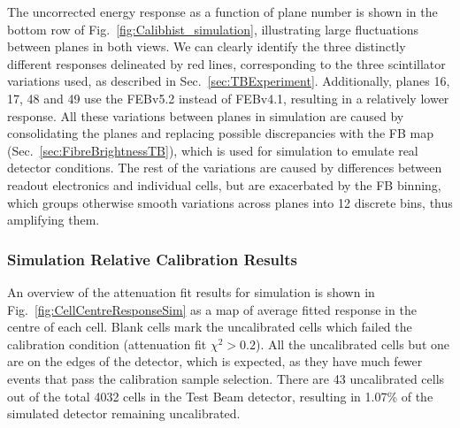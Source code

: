 The uncorrected energy response as a function of plane number is shown in the bottom row of Fig.~\ref{fig:Calibhist_simulation}, illustrating large fluctuations between planes in both views. We can clearly identify the three distinctly different responses delineated by red lines, corresponding to the three scintillator variations used, as described in Sec.~\ref{sec:TBExperiment}. Additionally, planes 16, 17, 48 and 49 use the \gls{FEB}v5.2 instead of \gls{FEB}v4.1, resulting in a relatively lower response. All these variations between planes in simulation are caused by consolidating the planes and replacing possible discrepancies with the \gls{FB} map (Sec.~\ref{sec:FibreBrightnessTB}), which is used for simulation to emulate real detector conditions. The rest of the variations are caused by differences between readout electronics and individual cells, but are exacerbated by the \gls{FB} binning, which groups otherwise smooth variations across planes into 12 discrete bins, thus amplifying them.

\subsubsection*{Simulation Relative Calibration Results}

An overview of the attenuation fit results for simulation is shown in Fig.~\ref{fig:CellCentreResponseSim} as a map of average fitted response in the centre of each cell. Blank cells mark the uncalibrated cells which failed the calibration condition (attenuation fit $\chi^2>0.2$). All the uncalibrated cells but one are on the edges of the detector, which is expected, as they have much fewer events that pass the calibration sample selection. There are 43 uncalibrated cells out of the total 4032 cells in the Test Beam detector, resulting in 1.07\% of the simulated detector remaining uncalibrated.

